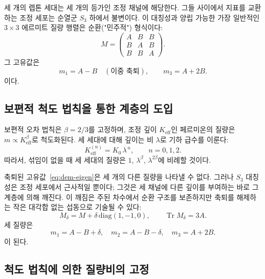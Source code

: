 \documentclass[11pt,a4paper]{article}
\theoremstyle{remark}
\begin{document}
	세 개의 렙톤 세대는 세 개의 등가인 조정 채널에 해당한다. 그들 사이에서 지표를 교환하는 조정 세포는 순열군 \(S_3\) 하에서 불변이다. 이 대칭성과 양립 가능한 가장 일반적인 \(3\times3\) 에르미트 질량 행렬은 순환("민주적") 형식이다:
	\begin{equation}
		M = \begin{pmatrix}
			A & B & B \\
			B & A & B \\
			B & B & A
		\end{pmatrix}.
		\label{eq:democratic}
	\end{equation}
	그 고유값은
	\begin{equation}
		m_1 = A - B \quad (\text{이중 축퇴}), \qquad
		m_3 = A + 2B .
		\label{eq:dem-eigen}
	\end{equation}
	이다.
	
	\subsection{보편적 척도 법칙을 통한 계층의 도입}
	
	보편적 오차 법칙은 \(\beta = 2/3\)를 고정하며, 조정 깊이 \(K_{\mathrm{eff}}\)인 페르미온의 질량은 \(m \propto K_{\mathrm{eff}}^{\beta}\)로 척도화된다. 세 세대에 대해 깊이는 비 \(\lambda\)로 기하 급수를 이룬다:
	\[
	K_{\mathrm{eff}}^{(n)} = K_0 \, \lambda^{\,n}, \qquad n = 0,1,2 .
	\]
	따라서, 섞임이 없을 때 세 세대의 질량은 \(1\), \(\lambda^{\beta}\), \(\lambda^{2\beta}\)에 비례할 것이다.
	
	축퇴된 고유값~\eqref{eq:dem-eigen}은 세 개의 다른 질량을 나타낼 수 없다. 그러나 \(S_3\) 대칭성은 조정 세포에서 근사적일 뿐이다; 그것은 세 채널에 다른 깊이를 부여하는 바로 그 계층에 의해 깨진다. 이 깨짐은 주된 차수에서 순환 구조를 보존하지만 축퇴를 해제하는 작은 대각합 없는 섭동으로 기술될 수 있다:
	\begin{equation}
		M_\delta = M + \delta \,\mathrm{diag}(1,-1,0), \qquad \operatorname{Tr} M_\delta = 3A .
	\end{equation}
	세 질량은
	\begin{equation}
		m_1 = A - B + \delta, \quad
		m_2 = A - B - \delta, \quad
		m_3 = A + 2B .
		\label{eq:three-masses}
	\end{equation}
	이 된다.
	
	\subsection{척도 법칙에 의한 질량비의 고정}
	
\end{document}
